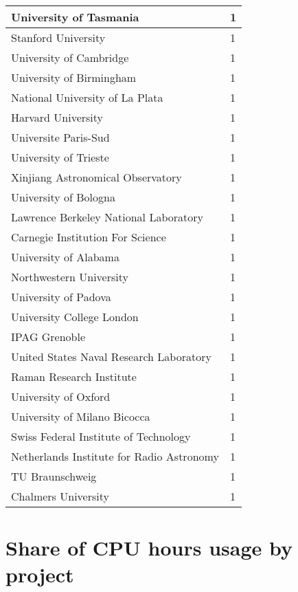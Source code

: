 \documentclass{article}%
\begin{document}
\begin{longtabu}{X[l] X[r]}
\hline%
University of Tasmania&1\\%
\hline%
Stanford University&1\\%
\hline%
University of Cambridge&1\\%
\hline%
University of Birmingham&1\\%
\hline%
National University of La Plata&1\\%
\hline%
Harvard University&1\\%
\hline%
Universite Paris{-}Sud&1\\%
\hline%
University of Trieste&1\\%
\hline%
Xinjiang Astronomical Observatory&1\\%
\hline%
University of Bologna&1\\%
\hline%
Lawrence Berkeley National Laboratory&1\\%
\hline%
Carnegie Institution For Science&1\\%
\hline%
University of Alabama&1\\%
\hline%
Northwestern University&1\\%
\hline%
University of Padova&1\\%
\hline%
University College London&1\\%
\hline%
IPAG Grenoble&1\\%
\hline%
United States Naval Research Laboratory&1\\%
\hline%
Raman Research Institute&1\\%
\hline%
University of Oxford&1\\%
\hline%
University of Milano Bicocca&1\\%
\hline%
Swiss Federal Institute of Technology&1\\%
\hline%
Netherlands Institute for Radio Astronomy&1\\%
\hline%
TU Braunschweig&1\\%
\hline%
Chalmers University&1\\%
\hline%
\end{longtabu}%
\section{Share of CPU hours usage by project}%
\end{document}
